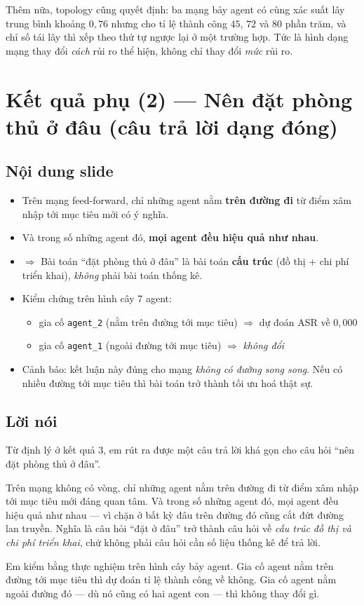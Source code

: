\documentclass[11pt,a4paper]{article}
\newcommand{\slide}[1]{\section{#1}}
\newcommand{\noidung}{\subsection*{Nội dung slide}}
\newcommand{\loinoi}{\subsection*{Lời nói}}
\begin{document}
Thêm nữa, topology cũng quyết định: ba mạng bảy agent có cùng xác suất lây trung bình
khoảng $0{,}76$ nhưng cho tỉ lệ thành công $45$, $72$ và $80$ phần trăm, và chỉ số tái
lây thì xếp theo thứ tự ngược lại ở một trường hợp. Tức là hình dạng mạng thay đổi
\emph{cách} rủi ro thể hiện, không chỉ thay đổi \emph{mức} rủi ro.

\slide{Kết quả phụ (2) --- Nên đặt phòng thủ ở đâu (câu trả lời dạng đóng)}

\noidung
\begin{itemize}
  \item Trên mạng feed-forward, chỉ những agent nằm \textbf{trên đường đi} từ điểm xâm
        nhập tới mục tiêu mới có ý nghĩa.
  \item Và trong số những agent đó, \textbf{mọi agent đều hiệu quả như nhau}.
  \item $\Rightarrow$ Bài toán ``đặt phòng thủ ở đâu'' là bài toán \textbf{cấu trúc}
        (đồ thị + chi phí triển khai), \emph{không} phải bài toán thống kê.
  \item Kiểm chứng trên hình cây 7 agent:
        \begin{itemize}
          \item gia cố \texttt{agent\_2} (nằm trên đường tới mục tiêu) $\Rightarrow$ dự
                đoán ASR về $0{,}000$
          \item gia cố \texttt{agent\_1} (ngoài đường tới mục tiêu) $\Rightarrow$
                \emph{không đổi}
        \end{itemize}
  \item Cảnh báo: kết luận này đúng cho mạng \emph{không có đường song song}. Nếu có
        nhiều đường tới mục tiêu thì bài toán trở thành tối ưu hoá thật sự.
\end{itemize}

\loinoi
Từ định lý ở kết quả 3, em rút ra được một câu trả lời khá gọn cho câu hỏi ``nên đặt
phòng thủ ở đâu''.

Trên mạng không có vòng, chỉ những agent nằm trên đường đi từ điểm xâm nhập tới mục
tiêu mới đáng quan tâm. Và trong số những agent đó, mọi agent đều hiệu quả như nhau ---
vì chặn ở bất kỳ đâu trên đường đó cũng cắt đứt đường lan truyền. Nghĩa là câu hỏi
``đặt ở đâu'' trở thành câu hỏi về \emph{cấu trúc đồ thị và chi phí triển khai}, chứ
không phải câu hỏi cần số liệu thống kê để trả lời.

Em kiểm bằng thực nghiệm trên hình cây bảy agent. Gia cố agent nằm trên đường tới mục
tiêu thì dự đoán tỉ lệ thành công về không. Gia cố agent nằm ngoài đường đó --- dù nó
cũng có hai agent con --- thì không thay đổi gì.
\end{document}
